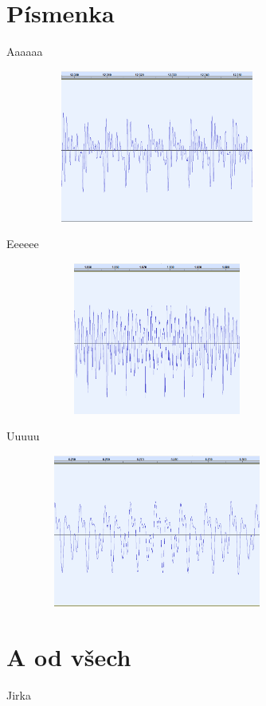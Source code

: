 \documentclass[12pt,a4paper]{article}
\begin{document}

\setlength{\parskip}{0.2cm}
\setlength{\parindent}{0cm}

\section{Písmenka}

Aaaaaa

\includegraphics[height=5cm,width=10cm]{aaa.png}

Eeeeee

\includegraphics[height=5cm,width=10cm]{eee.png}

Uuuuu

\includegraphics[height=5cm,width=10cm]{uuu.png}

\newpage

\section{A od všech}

Jirka
\end{document}
